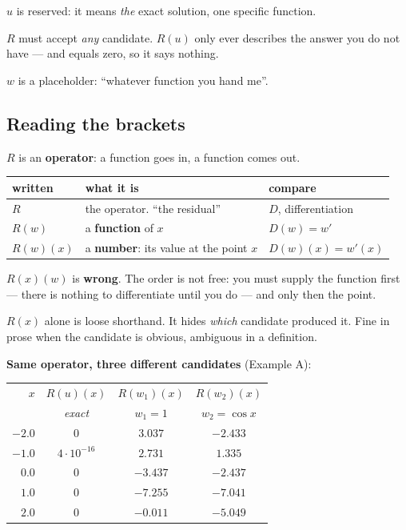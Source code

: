 \documentclass[11pt]{article}
\begin{document}
\begin{pts}
\item $u$ is reserved: it means \emph{the} exact solution, one specific function.
\item $R$ must accept \emph{any} candidate. $R(u)$ only ever describes the
      answer you do not have --- and equals zero, so it says nothing.
\item $w$ is a placeholder: ``whatever function you hand me''.
\end{pts}

\subsection*{Reading the brackets}

$R$ is an \textbf{operator}: a function goes in, a function comes out.

\begin{center}\small
\renewcommand{\arraystretch}{1.35}
\begin{tabular}{@{}lll@{}}
\toprule
\textbf{written} & \textbf{what it is} & \textbf{compare} \\
\midrule
$R$       & the operator. ``the residual''                  & $D$, differentiation \\
$R(w)$    & a \textbf{function} of $x$                      & $D(w)=w'$ \\
$R(w)(x)$ & a \textbf{number}: its value at the point $x$   & $D(w)(x)=w'(x)$ \\
\bottomrule
\end{tabular}
\end{center}

\begin{pts}
\item $R(x)(w)$ is \textbf{wrong}. The order is not free: you must supply the
      function first --- there is nothing to differentiate until you do --- and
      only then the point.
\item $R(x)$ alone is loose shorthand. It hides \emph{which} candidate produced
      it. Fine in prose when the candidate is obvious, ambiguous in a definition.
\end{pts}

\medskip
\textbf{Same operator, three different candidates} (Example A):

\begin{center}\small
\renewcommand{\arraystretch}{1.2}
\begin{tabular}{@{}rccc@{}}
\toprule
$x$ & $R(u)(x)$ & $R(w_1)(x)$ & $R(w_2)(x)$\\
    & \emph{exact} & $w_1=1$  & $w_2=\cos x$\\
\midrule
$-2.0$ & $0$              & $3.037$  & $-2.433$\\
$-1.0$ & $4\cdot10^{-16}$ & $2.731$  & $1.335$\\
$ 0.0$ & $0$              & $-3.437$ & $-2.437$\\
$ 1.0$ & $0$              & $-7.255$ & $-7.041$\\
$ 2.0$ & $0$              & $-0.011$ & $-5.049$\\
\bottomrule
\end{tabular}
\end{center}
\end{document}
